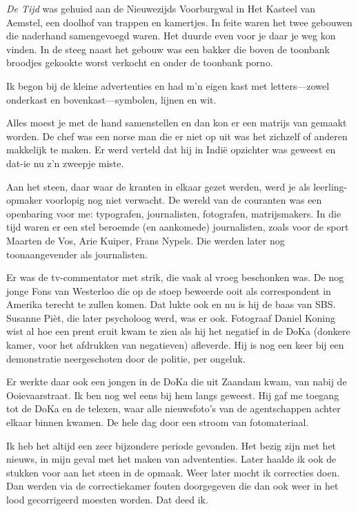 \documentclass[10pt,twoside, openright]{memoir}
\begin{document}
\emph{De Tijd} was gehuisd aan de Nieuwezijds Voorburgwal in Het Kasteel van Aemstel, een doolhof van trappen en kamertjes. In feite waren het twee gebouwen die naderhand samengevoegd waren. Het duurde even voor je daar je weg kon vinden. In de steeg naast het gebouw was een bakker die boven de toonbank broodjes gekookte worst verkocht en onder de toonbank porno. 

Ik begon bij de kleine advertenties en had m'n eigen kast met letters---zowel onderkast en bovenkast---symbolen, lijnen en wit.

Alles moest je met de hand samenstellen en dan kon er een matrijs van gemaakt worden. De chef was een norse man die er niet op uit was het zichzelf of anderen makkelijk te maken. Er werd verteld dat hij in Indië opzichter was geweest en dat-ie nu z'n zweepje miste.

Aan het steen, daar waar de kranten in elkaar gezet werden, werd je als leerling-opmaker voorlopig nog niet verwacht. De wereld van de couranten was een openbaring voor me: typografen, journalisten, fotografen, matrijsmakers. In die tijd waren er een stel beroemde (en aankomede) journalisten, zoals voor de sport Maarten de Vos, Arie Kuiper, Frans Nypels. Die werden later nog toonaangevender als journalisten. 

Er was de tv-commentator met strik, die vaak al vroeg beschonken was. De nog jonge Fons van Westerloo die op de stoep beweerde ooit als correspondent in Amerika terecht te zullen komen. Dat lukte ook en nu is hij de baas van SBS. Susanne Pièt, die later psycholoog werd, was er ook. Fotograaf Daniel Koning wist al hoe een prent eruit kwam te zien als hij het negatief in de DoKa (donkere kamer, voor het afdrukken van negatieven) afleverde. Hij is nog een keer bij een demonstratie neergeschoten door de politie, per ongeluk. 

Er werkte daar ook een jongen in de DoKa die uit Zaandam kwam,  van nabij de Ooievaarstraat. Ik ben nog wel eens bij hem langs geweest. Hij gaf me toegang tot de DoKa en de telexen, waar alle nieuwsfoto’s van de agentschappen achter elkaar binnen kwamen. De hele dag door een stroom van fotomateriaal. 

Ik heb het altijd een zeer bijzondere periode gevonden. Het bezig zijn met het nieuws, in mijn geval met het maken van advententies. Later haalde ik ook de stukken voor aan het steen in de opmaak. Weer later mocht ik correcties doen. Dan werden via de correctiekamer fouten doorgegeven die dan ook weer in het lood gecorrigeerd moesten worden. Dat deed ik. 
\end{document}
